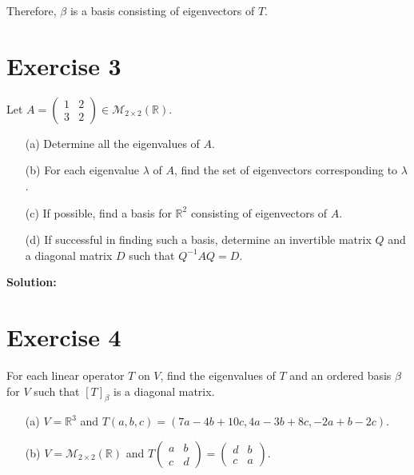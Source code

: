 \documentclass{article}
\begin{document}
Therefore, $\beta$ is a basis consisting of eigenvectors of $T$.

\newpage

\section*{Exercise 3}
Let $A = \begin{pmatrix} 1 & 2 \\ 3 & 2 \end{pmatrix} \in \mathcal{M}_{2\times 2}(\mathbb{R})$.

\begin{enumerate}
    \item[(a)] Determine all the eigenvalues of $A$.

    \item[(b)] For each eigenvalue $\lambda$ of $A$, find the set of eigenvectors corresponding to $\lambda$.

    \item[(c)] If possible, find a basis for $\mathbb{R}^2$ consisting of eigenvectors of $A$.

    \item[(d)] If successful in finding such a basis, determine an invertible matrix $Q$ and a diagonal matrix $D$ such that $Q^{-1}AQ = D$.
\end{enumerate}

\textbf{Solution:} \\



\newpage

\section*{Exercise 4}
For each linear operator $T$ on $V$, find the eigenvalues of $T$ and an ordered basis $\beta$ for $V$ such that $[T]_\beta$ is a diagonal matrix.

\begin{enumerate}
    \item[(a)] $V = \mathbb{R}^3$ and $T(a,b,c) = (7a - 4b + 10c, 4a - 3b + 8c, -2a + b - 2c)$.

    \item[(b)] $V = \mathcal{M}_{2\times 2}(\mathbb{R})$ and $T\begin{pmatrix} a & b \\ c & d \end{pmatrix} = \begin{pmatrix} d & b \\ c & a \end{pmatrix}$.
\end{enumerate}
\end{document}
